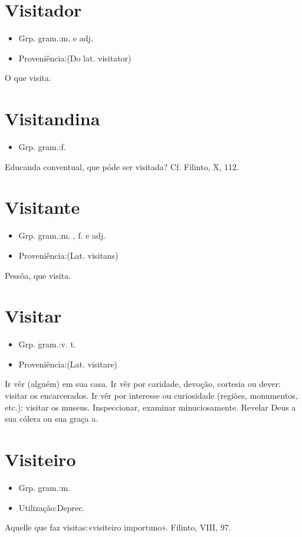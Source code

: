 \documentclass{article}
\begin{document}
\section{Visitador}
\begin{itemize}
\item {Grp. gram.:m.  e  adj.}
\end{itemize}
\begin{itemize}
\item {Proveniência:(Do lat. \textunderscore visitator\textunderscore )}
\end{itemize}
O que visita.
\section{Visitandina}
\begin{itemize}
\item {Grp. gram.:f.}
\end{itemize}
Educanda conventual, que póde ser visitada? Cf. Filinto, X, 112.
\section{Visitante}
\begin{itemize}
\item {Grp. gram.:m. ,  f.  e  adj.}
\end{itemize}
\begin{itemize}
\item {Proveniência:(Lat. \textunderscore visitans\textunderscore )}
\end{itemize}
Pessôa, que visita.
\section{Visitar}
\begin{itemize}
\item {Grp. gram.:v. t.}
\end{itemize}
\begin{itemize}
\item {Proveniência:(Lat. \textunderscore visitare\textunderscore )}
\end{itemize}
Ir vêr (alguém) em sua casa.
Ir vêr por caridade, devoção, cortesia ou dever: \textunderscore visitar os encarcerados\textunderscore .
Ir vêr por interesse ou curiosidade (regiões, monumentos, etc.): \textunderscore visitar os museus\textunderscore .
Inspeccionar, examinar minuciosamente.
Revelar Deus a sua cólera ou sua graça a.
\section{Visiteiro}
\begin{itemize}
\item {Grp. gram.:m.}
\end{itemize}
\begin{itemize}
\item {Utilização:Deprec.}
\end{itemize}
Aquelle que faz visitas:«\textunderscore visiteiro importuno\textunderscore ». Filinto, VIII, 97.
\end{document}
